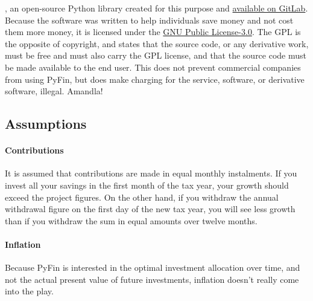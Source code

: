 \documentclass[a4paper, justified]{tufte-handout}
\begin{document}
, an open-source Python library created for this purpose and \href{https://gitlab.com/invokeanalytics/pyfin}{available on GitLab}. Because the software was written to help individuals save money and not cost them more money, it is licensed under the \href{https://opensource.org/licenses/GPL-3.0}{GNU Public License-3.0}. The GPL is the opposite of copyright, and states that the source code, or any derivative work, must be free and must also carry the GPL license, and that the source code must be made available to the end user. This does not prevent commercial companies from using PyFin, but does make charging for the service, software, or derivative software, illegal. Amandla!

\subsection{Assumptions}

\paragraph{Contributions} It is assumed that contributions are made in equal monthly instalments. If you invest all your savings in the first month of the tax year, your growth should exceed the project figures. On the other hand, if you withdraw the annual withdrawal figure on the first day of the new tax year, you will see less growth than if you withdraw the sum in equal amounts over twelve months.

\paragraph{Inflation} Because PyFin is interested in the optimal investment allocation over time, and not the actual present value of future investments, inflation doesn't really come into the play.
\end{document}
